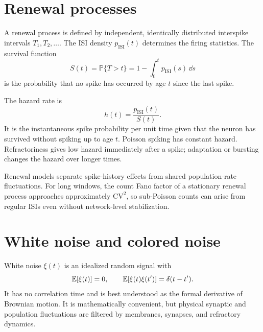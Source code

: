 \section{Renewal processes}
\label{sec:renewal-processes}

A renewal process is defined by independent, identically distributed interspike intervals $T_1,T_2,\ldots$. The ISI density $p_{\mathrm{ISI}}(t)$ determines the firing statistics. The survival function
%
\begin{equation}
  S(t)=\mathbb{P}\{T>t\}
  =1-\int_0^t p_{\mathrm{ISI}}(s)\,\dd s
  \label{eq:isi-survival}
\end{equation}
%
is the probability that no spike has occurred by age $t$ since the last spike.

The hazard rate is
%
\begin{equation}
  h(t)=\frac{p_{\mathrm{ISI}}(t)}{S(t)}.
  \label{eq:renewal-hazard}
\end{equation}
%
It is the instantaneous spike probability per unit time given that the neuron has survived without spiking up to age $t$. Poisson spiking has constant hazard. Refractoriness gives low hazard immediately after a spike; adaptation or bursting changes the hazard over longer times.

Renewal models separate spike-history effects from shared population-rate fluctuations. For long windows, the count Fano factor of a stationary renewal process approaches approximately $\mathrm{CV}^2$, so sub-Poisson counts can arise from regular ISIs even without network-level stabilization.

\section{White noise and colored noise}
\label{sec:white-colored-noise}

White noise $\xi(t)$ is an idealized random signal with
%
\begin{equation}
  \mathbb{E}[\xi(t)]=0,
  \qquad
  \mathbb{E}[\xi(t)\xi(t')]=\delta(t-t').
  \label{eq:white-noise-definition}
\end{equation}
%
It has no correlation time and is best understood as the formal derivative of Brownian motion. It is mathematically convenient, but physical synaptic and population fluctuations are filtered by membranes, synapses, and refractory dynamics.

